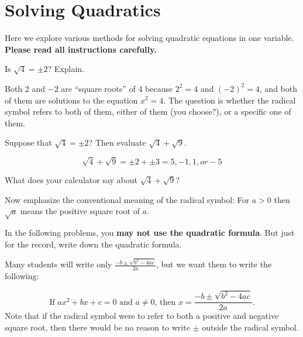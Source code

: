 \newpage
\section{Solving Quadratics}\label{A:solvingQuadratics}
Here we explore various methods for solving quadratic equations in one variable.  \textbf{Please read all instructions carefully.}

\begin{prob}
Is $\sqrt{4}=\pm 2$?  Explain. 
\end{prob}

\vfill

\begin{teachingnote}
Both $2$ and $-2$ are ``square roots'' of $4$ because $2^2=4$ and $(-2)^2=4$, and both of them are solutions to the equation $x^2=4$.  The question is whether the radical symbol refers to both of them, either of them (you choose?), or a specific one of them.  
\end{teachingnote}

\begin{prob}
Suppose that $\sqrt{4}=\pm 2$?  Then evaluate $\sqrt{4}+\sqrt{9}$.  
\end{prob}

\begin{teachingnote}
$$\sqrt{4}+\sqrt{9}=\pm2+\pm3=5, -1, 1, or -5$$
\end{teachingnote}

\vfill

\begin{prob}
What does your calculator say about $\sqrt{4}+\sqrt{9}$?  
\end{prob}

\vfill 

\begin{teachingnote}
Now emphasize the conventional meaning of the radical symbol:  For $a>0$ then $\sqrt{a}$ means the positive square root of $a$.  
\end{teachingnote}



\begin{prob}
In the following problems, you \textbf{may not use the quadratic formula}.  But just for the record, write down the quadratic formula.  
\end{prob}
\begin{teachingnote}
Many students will write only $\frac{-b\pm\sqrt{b^2-4ac}}{2a}$, but we want them to write the following:  

$$\text{If }ax^2+bx+c=0\text{ and }a\ne 0\text{, then }x=\frac{-b\pm\sqrt{b^2-4ac}}{2a}\text{.}$$
Note that if the radical symbol were to refer to both a positive and negative square root, then there would be no reason to write $\pm$ outside the radical symbol.  
\end{teachingnote}

